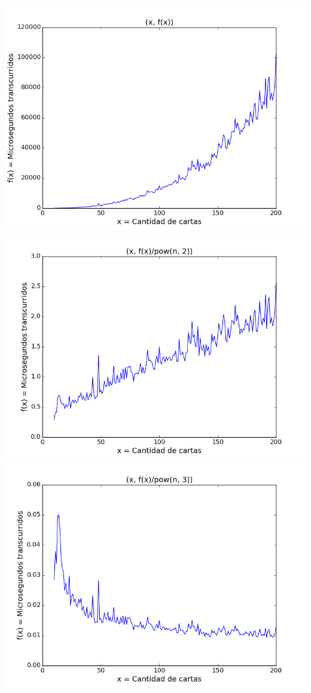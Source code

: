 \begin{center}
	\includegraphics[scale=0.7]{images/funcion.png}
	\includegraphics[scale=0.7]{images/sobrencuadrado.png}
	\includegraphics[scale=0.7]{images/sobrencubo.png}
\end{center}
